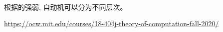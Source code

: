 
\begin{frame}{}
  \begin{center}

    \vspace{0.50cm}
    根据的强弱, 自动机可以分为不同层次。
  \end{center}
\end{frame}

\begin{frame}{}
	\begin{center}

		\vspace{0.30cm}
		\url{https://ocw.mit.edu/courses/18-404j-theory-of-computation-fall-2020/}
	\end{center}
\end{frame}

\begin{frame}{}
	\begin{center}
	\end{center}
\end{frame}
